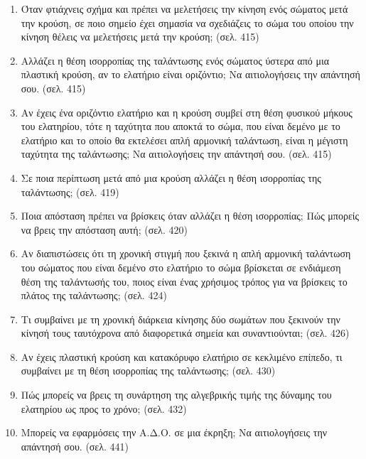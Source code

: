 \documentclass{article}
\begin{document}
\begin{enumerate}
      \item Όταν φτιάχνεις σχήμα και πρέπει να μελετήσεις την κίνηση ενός σώματος μετά την κρούση, σε ποιο σημείο έχει σημασία να σχεδιάζεις το σώμα του οποίου την κίνηση θέλεις να μελετήσεις μετά την κρούση; (σελ. 415)

      \item Αλλάζει η θέση ισορροπίας της ταλάντωσης ενός σώματος ύστερα από μια πλαστική κρούση, αν το ελατήριο είναι οριζόντιο; Να αιτιολογήσεις την απάντησή σου. (σελ. 415)

      \item Αν έχεις ένα οριζόντιο ελατήριο και η κρούση συμβεί στη θέση φυσικού μήκους του ελατηρίου, τότε η ταχύτητα που αποκτά το σώμα, που είναι δεμένο με το ελατήριο και το οποίο θα εκτελέσει απλή αρμονική ταλάντωση, είναι η μέγιστη ταχύτητα της ταλάντωσης; Να αιτιολογήσεις την απάντησή σου. (σελ. 415)

      \item Σε ποια περίπτωση μετά από μια κρούση αλλάζει η θέση ισορροπίας της ταλάντωσης; (σελ. 419)

      \item Ποια απόσταση πρέπει να βρίσκεις όταν αλλάζει η θέση ισορροπίας; Πώς μπορείς να βρεις την απόσταση αυτή; (σελ. 420)

      \item Αν διαπιστώσεις ότι τη χρονική στιγμή που ξεκινά η απλή αρμονική ταλάντωση του σώματος που είναι δεμένο στο ελατήριο το σώμα βρίσκεται σε ενδιάμεση θέση της ταλάντωσής του, ποιος είναι ένας χρήσιμος τρόπος για να βρίσκεις το πλάτος της ταλάντωσης; (σελ. 424)

      \item Τι συμβαίνει με τη χρονική διάρκεια κίνησης δύο σωμάτων που ξεκινούν την κίνησή τους ταυτόχρονα από διαφορετικά σημεία και συναντιούνται; (σελ. 426)

      \item Αν έχεις πλαστική κρούση και κατακόρυφο ελατήριο σε κεκλιμένο επίπεδο, τι συμβαίνει με τη θέση ισορροπίας της ταλάντωσης; (σελ. 430)

      \item Πώς μπορείς να βρεις τη συνάρτηση της αλγεβρικής τιμής της δύναμης του ελατηρίου ως προς το χρόνο; (σελ. 432)

      \item Μπορείς να εφαρμόσεις την Α.Δ.Ο. σε μια έκρηξη; Να αιτιολογήσεις την απάντησή σου. (σελ. 441)
\end{enumerate}
\end{document}
